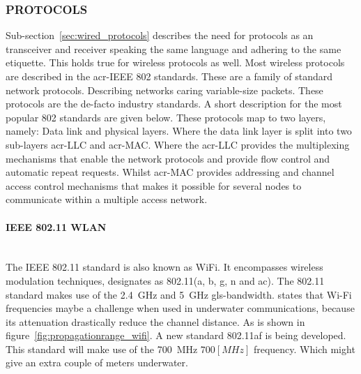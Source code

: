 \subsubsection{PROTOCOLS}
Sub-section~\ref{sec:wired_protocols} describes the need for protocols as an transceiver and receiver speaking the same language and adhering to the same etiquette. This holds true for wireless protocols as well. Most wireless protocols are described in the \gls{acr-IEEE} 802 standards. These are a family of standard network protocols. Describing networks caring variable-size packets. These protocols are the de-facto industry standards. A short description for the most popular 802 standards are given below. These protocols map to two layers, namely: Data link and physical layers. Where the data link layer is split into two sub-layers \gls{acr-LLC} and \gls{acr-MAC}. Where the \gls{acr-LLC} provides the multiplexing mechanisms that enable the network protocols and provide flow control and automatic repeat requests. Whilst \gls{acr-MAC} provides addressing and channel access control mechanisms that makes it possible for several nodes to communicate within a multiple access network.

\paragraph{IEEE 802.11 WLAN} \hfil \\
The IEEE 802.11 standard is also known as WiFi. It encompasses wireless modulation techniques, designates as 802.11(a, b, g, n and ac). The 802.11 standard makes use of the \SI{2.4}{\giga\hertz} and \SI{5}{\giga\hertz} \gls{gls-bandwidth}. \citet{freitas_evaluation_2014} states that Wi-Fi frequencies maybe a challenge when used in underwater communications, because its attenuation drastically reduce the channel distance. As is shown in figure~\ref{fig:propagationrange_wifi}.
A new standard 802.11af is being developed. This standard will make use of the \SI{700}{\mega\hertz} $ 700 [MHz] $ frequency. Which might give an extra couple of meters underwater.

